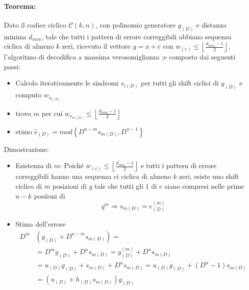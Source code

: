             \paragraph{Teorema:} Dato il codice ciclico $\mathcal{C}(k,n)$, con polinomio generatore $g_{(D)}$ e distanza 
                minima $d_{min}$, tale che tutti i pattern di errore correggibili abbiano sequenza ciclica di almeno $k$ zeri,
                ricevuto il vettore $y=x+e$ con $w_{(e)}\leq\left\lfloor \frac{d_{min}-1}{2}\right\rfloor$, l'algoritmo di decodifica a massima
                verosomiglianza ;e composto dai seguenti passi:
                \begin{itemize}
                    \item {Calcolo iterativamente le sindromi $s_{i(D)}$ per tutti gli shift ciclici di $y_{(D)}$ e computo $w_{s_{i(D)}}$}
                    \item {trovo $m$ per cui $w_{s_{m(D)}}\leq \left\lfloor \frac{d_{min}-1}{2}\right\rfloor $}
                    \item {stimo $\hat{e}_{(D)} = mod\left\{D^{n-m}s_{m(D)},D^{n-1}\right\} $}
                \end{itemize}
                Dimostrazione:
                \begin{itemize}
                    \item {
                        Esistenza di $m$: Poiché $w_{(e)}\leq\left\lfloor \frac{d_{min}-1}{2}\right\rfloor$ e tutti i pattern di errore
                        correggibili hanno una sequenza ci ciclica di almeno $k$ zeri, esiste uno shift ciclico di $m$ posizioni di $y$
                        tale che tutti gli $1$ di $e$ siano compresi nelle prime $n-k$ posiioni di
                        \[
                            y^m\Rightarrow s_{m(D)} = e_{(D)}^{(m)}    
                        \]
                    }
                    \item {
                        Stima dell'errore
                        \begin{align}
                            D^m &(y_{(D)}+D^{n-m}s_{m(D)}) = \nonumber \\
                                &= D^my_{(D)}+D^ns_{m(D)} = y^{(m)}_{(D)}+ D^ns_{m(D)}\nonumber \\
                                &= u_{(D)}g_{(D)}+s_{m(D)}+D^ns_{m(D)} = u_{(D)}g_{(D)}+(D^n-1)s_{m(D)}\nonumber \\
                                &= (u_{(D)}+h_{(D)}s_{m(D)})g_{(D)}\nonumber
                        \end{align}
                    }
                \end{itemize}
